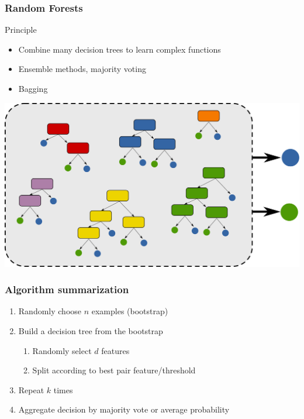 \documentclass[11pt]{beamer}
\begin{document}
\begin{frame}
    \frametitle{Random Forests}
    \begin{block}{Principle}
      \begin{itemize}
      \item Combine many decision trees to learn complex functions
      \item Ensemble methods, majority voting 
      \item Bagging \cite{breiman1996bagging}
      \end{itemize}
  
      \begin{center}
        \includegraphics[width=.7\textwidth]{random_forests}
      \end{center}
    \end{block}
   
  \end{frame}


\begin{frame}
  \frametitle{Algorithm summarization}
  \begin{enumerate}
  \item Randomly choose $n$ examples (bootstrap)
  \item Build a decision tree from the bootstrap
    \begin{enumerate}
    \item Randomly select $d$ features
    \item Split according to best pair feature/threshold
    \end{enumerate}
  \item Repeat $k$ times
  \item Aggregate decision by majority vote or average probability 
  \end{enumerate}
\end{frame}
\end{document}
